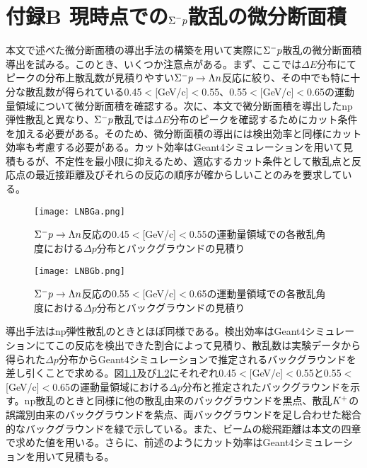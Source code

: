 
\graphicspath{{./pictures/appendix1/}}
\def\thesection{B.\arabic{section}}
\chapter{{\bf 付録B 現時点での$\Sigma^{-} p$散乱の微分断面積}}
本文で述べた微分断面積の導出手法の構築を用いて実際に$\Sigma^{-} p$散乱の微分断面積導出を試みる。このとき、いくつか注意点がある。まず、ここでは$\Delta E$分布にてピークの分布上散乱数が見積りやすい$\Sigma^{-} p\rightarrow\Lambda n$反応に絞り、その中でも特に十分な散乱数が得られている0.45$<$[GeV/c]$<$0.55、0.55$<$[GeV/c]$<$0.65の運動量領域について微分断面積を確認する。次に、本文で微分断面積を導出したnp弾性散乱と異なり、$\Sigma^{-} p$散乱では$\Delta E$分布のピークを確認するためにカット条件を加える必要がある。そのため、微分断面積の導出には検出効率と同様にカット効率も考慮する必要がある。カット効率はGeant4シミュレーションを用いて見積もるが、不定性を最小限に抑えるため、適応するカット条件として散乱点と反応点の最近接距離及びそれらの反応の順序が確からしいことのみを要求している。\par
\begin{figure}[!tbp]
 \begin{center}
   \texttt{[image: LNBGa.png]}
   \caption{$\Sigma^{-} p\rightarrow\Lambda n$反応の0.45$<$[GeV/c]$<$0.55の運動量領域での各散乱角度における$\Delta p$分布とバックグラウンドの見積り}
           \label{fig:LNBGa}
 \end{center}
\end{figure}
\begin{figure}[!tbp]
 \begin{center}
   \texttt{[image: LNBGb.png]}
   \caption{$\Sigma^{-} p\rightarrow\Lambda n$反応の0.55$<$[GeV/c]$<$0.65の運動量領域での各散乱角度における$\Delta p$分布とバックグラウンドの見積り}
           \label{fig:LNBGb}
 \end{center}
\end{figure}
導出手法はnp弾性散乱のときとほぼ同様である。検出効率はGeant4シミュレーションにてこの反応を検出できた割合によって見積り、散乱数は実験データから得られた$\Delta p$分布からGeant4シミュレーションで推定されるバックグラウンドを差し引くことで求める。図\ref{fig:LNBGa}及び\ref{fig:LNBGb}にそれぞれ0.45$<$[GeV/c]$<$0.55と0.55$<$[GeV/c]$<$0.65の運動量領域における$\Delta p$分布と推定されたバックグラウンドを示す。np散乱のときと同様に他の散乱由来のバックグラウンドを黒点、散乱$K^{+}$の誤識別由来のバックグラウンドを紫点、両バックグラウンドを足し合わせた総合的なバックグラウンドを緑で示している。また、ビームの総飛距離は本文の四章で求めた値を用いる。さらに、前述のようにカット効率はGeant4シミュレーションを用いて見積もる。\par
